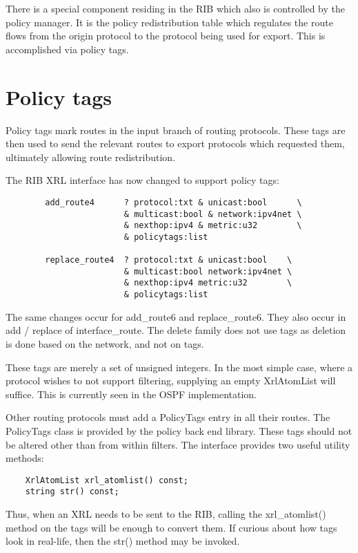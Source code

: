 \documentclass{article}
\begin{document}
There is a special component residing in the RIB which also is controlled by the
policy manager. It is the policy redistribution table which regulates the route
flows from the origin protocol to the protocol being used for export.  This is
accomplished via policy tags.

\section{Policy tags}
Policy tags mark routes in the input branch of routing protocols. These tags are
then used to send the relevant routes to export protocols which requested them,
ultimately allowing route redistribution.

The RIB XRL interface has now changed to support policy tags:
\begin{verbatim}
        add_route4      ? protocol:txt & unicast:bool      \
                        & multicast:bool & network:ipv4net \ 
                        & nexthop:ipv4 & metric:u32        \
                        & policytags:list

        replace_route4  ? protocol:txt & unicast:bool    \
                        & multicast:bool network:ipv4net \
                        & nexthop:ipv4 metric:u32        \
                        & policytags:list

\end{verbatim}
The same changes occur for add\_route6 and replace\_route6. They also occur in
add / replace of interface\_route. The delete family does not use tags as
deletion is done based on the network, and not on tags.

These tags are merely a set of unsigned integers. In the most simple case, where
a protocol wishes to not support filtering, supplying an empty XrlAtomList will
suffice. This is currently seen in the OSPF implementation.

Other routing protocols must add a PolicyTags entry in all their routes. The
PolicyTags class is provided by the policy back end library. These tags should
not be altered other than from within filters. The interface provides two
useful utility methods:
\begin{verbatim}
    XrlAtomList xrl_atomlist() const;
    string str() const;
\end{verbatim}
Thus, when an XRL needs to be sent to the RIB, calling the xrl\_atomlist()
method on the tags will be enough to convert them. If curious about how tags look
in real-life, then the str() method may be invoked.
\end{document}
